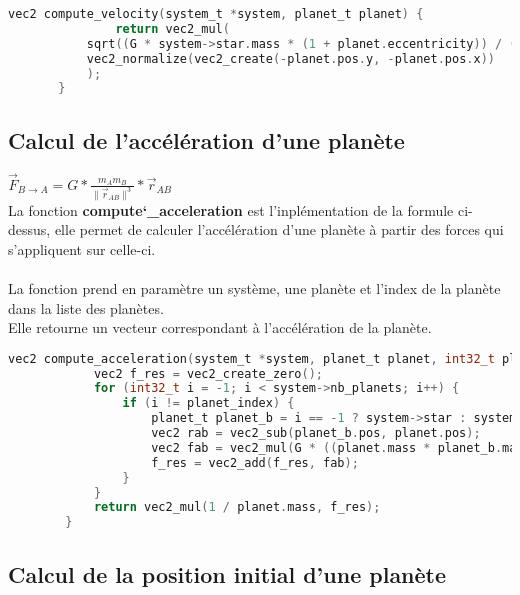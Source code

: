 \documentclass[a4paper,10pt]{article}
\begin{document}
    \begin{lstlisting}[language=c,label={lst:lstlisting3}]
        vec2 compute_velocity(system_t *system, planet_t planet) {
               return vec2_mul(
           sqrt((G * system->star.mass * (1 + planet.eccentricity)) / (planet.semi_major_axis * (1 - planet.eccentricity))),
           vec2_normalize(vec2_create(-planet.pos.y, -planet.pos.x))
           );
       }
    \end{lstlisting}
    
    \subsection{Calcul de l'accélération d'une planète}\label{subsec:calcul-de-l'accélération-d'une-planète}

    $\vec{F}_{B\to{}A} = G * \frac{m_{A}m_{B}}{\|\vec{r}_{AB}\|^{3}} * \vec{r}_{AB}$\\
    
    La fonction \textbf{compute\char`_acceleration} est l'inplémentation de la formule ci-dessus, elle permet de calculer l'accélération d'une planète à partir des forces qui s'appliquent sur celle-ci. \\\\
    La fonction prend en paramètre un système, une planète et l'index de la planète dans la liste des planètes.\\
    Elle retourne un vecteur correspondant à l'accélération de la planète.

    \begin{lstlisting}[language=c,label={lst:lstlisting4}]
        vec2 compute_acceleration(system_t *system, planet_t planet, int32_t planet_index) {
            vec2 f_res = vec2_create_zero();
            for (int32_t i = -1; i < system->nb_planets; i++) {
                if (i != planet_index) {
                    planet_t planet_b = i == -1 ? system->star : system->planets[i];
                    vec2 rab = vec2_sub(planet_b.pos, planet.pos);
                    vec2 fab = vec2_mul(G * ((planet.mass * planet_b.mass) / pow(vec2_norm(rab), 3)), rab);
                    f_res = vec2_add(f_res, fab);
                }
            }
            return vec2_mul(1 / planet.mass, f_res);
        }
    \end{lstlisting}
    
    \subsection{Calcul de la position initial d'une planète}\label{subsec:calcul-de-la-position-initial-d'une-planète}
\end{document}
